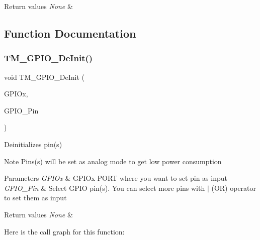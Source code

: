\begin{DoxyRetVals}{Return values}
{\em None} & \\
\hline
\end{DoxyRetVals}


\subsection{Function Documentation}
\mbox{\label{group___t_m___g_p_i_o___functions_gac87f1d18ac3e984bce0cbf44f7210198}} 
\subsubsection{\texorpdfstring{T\+M\+\_\+\+G\+P\+I\+O\+\_\+\+De\+Init()}{TM\_GPIO\_DeInit()}}
{\footnotesize\ttfamily void T\+M\+\_\+\+G\+P\+I\+O\+\_\+\+De\+Init (\begin{DoxyParamCaption}\item[{G\+P\+I\+O\+\_\+\+Type\+Def $\ast$}]{G\+P\+I\+Ox,  }\item[{uint16\+\_\+t}]{G\+P\+I\+O\+\_\+\+Pin }\end{DoxyParamCaption})}



Deinitializes pin(s) 

\begin{DoxyNote}{Note}
Pins(s) will be set as analog mode to get low power consumption 
\end{DoxyNote}

\begin{DoxyParams}{Parameters}
{\em G\+P\+I\+Ox} & G\+P\+I\+Ox P\+O\+RT where you want to set pin as input \\
\hline
{\em G\+P\+I\+O\+\_\+\+Pin} & Select G\+P\+IO pin(s). You can select more pins with $\vert$ (OR) operator to set them as input \\
\hline
\end{DoxyParams}

\begin{DoxyRetVals}{Return values}
{\em None} & \\
\hline
\end{DoxyRetVals}
Here is the call graph for this function\+:
\mbox{\label{group___t_m___g_p_i_o___functions_ga72bffec02520314763c10defc9406400}} 
